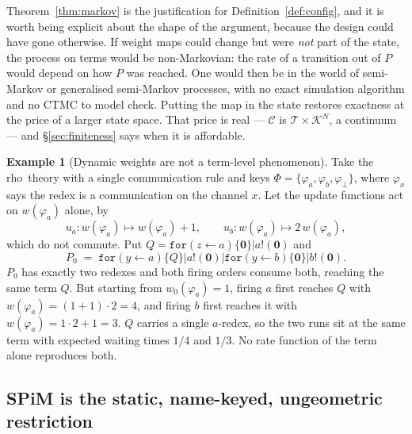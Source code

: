 \documentclass[11pt,a4paper]{article}
\theoremstyle{plain}
\theoremstyle{definition}
\newtheorem{example}[theorem]{Example}
\theoremstyle{remark}
\newcommand{\rhoc}{\textsf{rho}}
\newcommand{\Nil}{\mathbf{0}}
\newcommand{\sepc}{\mathbin{\big|}}
\newcommand{\Terms}{\mathcal{T}}
\newcommand{\Cfg}{\mathcal{C}}
\newcommand{\wmap}{w}
\begin{document}
Theorem~\ref{thm:markov} is the justification for Definition~\ref{def:config}, and it is worth being
explicit about the shape of the argument, because the design could have gone otherwise. If weight
maps could change but were \emph{not} part of the state, the process on terms would be
non-Markovian: the rate of a transition out of $P$ would depend on how $P$ was reached. One would
then be in the world of semi-Markov or generalised semi-Markov processes, with no exact simulation
algorithm and no CTMC to model check. Putting the map in the state restores exactness at the price
of a larger state space. That price is real --- $\Cfg$ is $\Terms \times \mathcal{K}^N$, a
continuum --- and \S\ref{sec:finiteness} says when it is affordable.

\begin{example}[Dynamic weights are not a term-level phenomenon]
\label{ex:nonmarkov}
Take the \rhoc\ theory with a single communication rule and keys
$\Phi = \{\varphi_a, \varphi_b, \varphi_\bot\}$, where $\varphi_x$ says the redex is a communication
on the channel $x$. Let the update functions act on $\wmap(\varphi_a)$ alone, by
\[
u_a : \wmap(\varphi_a) \mapsto \wmap(\varphi_a) + 1,
\qquad
u_b : \wmap(\varphi_a) \mapsto 2\,\wmap(\varphi_a),
\]
which do not commute. Put $Q = \texttt{for}(z \leftarrow a)\{\Nil\} \sepc a!(\Nil)$ and
\[
P_0 \;=\; \texttt{for}(y \leftarrow a)\{Q\} \sepc a!(\Nil) \sepc \texttt{for}(y\leftarrow b)\{\Nil\} \sepc b!(\Nil).
\]
$P_0$ has exactly two redexes and both firing orders consume both, reaching the same term $Q$. But
starting from $\wmap_0(\varphi_a) = 1$, firing $a$ first reaches $Q$ with
$\wmap(\varphi_a) = (1+1)\cdot 2 = 4$, and firing $b$ first reaches it with
$\wmap(\varphi_a) = 1\cdot 2 + 1 = 3$. $Q$ carries a single $a$-redex, so the two runs sit at the
same term with expected waiting times $1/4$ and $1/3$. No rate function of the term alone reproduces
both.
\end{example}

\subsection{SPiM is the static, name-keyed, ungeometric restriction}
\label{sec:spim}
\end{document}
